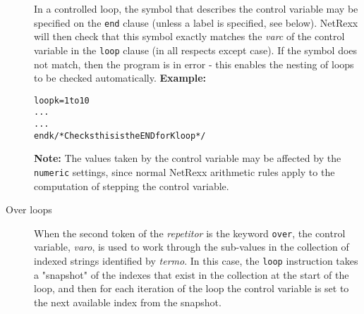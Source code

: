 \begin{description}
In a controlled loop, the symbol that describes the control variable may
be specified on the \texttt{end} clause (unless a label is specified,
see below).
NetRexx will then check that this symbol exactly matches the
\emph{varc} of the control variable in the \texttt{loop} clause (in
all respects except case).
If the symbol does not match, then the program is in error - this
enables the nesting of loops to be checked automatically.
 \textbf{Example:}
\begin{alltt}
loop k=1 to 10
  ...
  ...
  end k  /* Checks this is the END for K loop */
\end{alltt}
\textbf{Note: }The values taken by the control variable may be affected by the
\texttt{numeric} settings, since normal NetRexx arithmetic rules apply
to the computation of stepping the control variable.
\item[Over loops]\label{refloopov}

When the second token of the \emph{repetitor} is the keyword
\texttt{over}, the control variable, \emph{varo}, is used
to work through the sub-values in the collection of indexed strings
identified by \emph{termo}.
In this case, the \texttt{loop} instruction takes a "snapshot" of
the indexes that exist in the collection at the start of the loop, and
then for each iteration of the loop the control variable is set to the
next available index from the snapshot.
 

\end{description}
